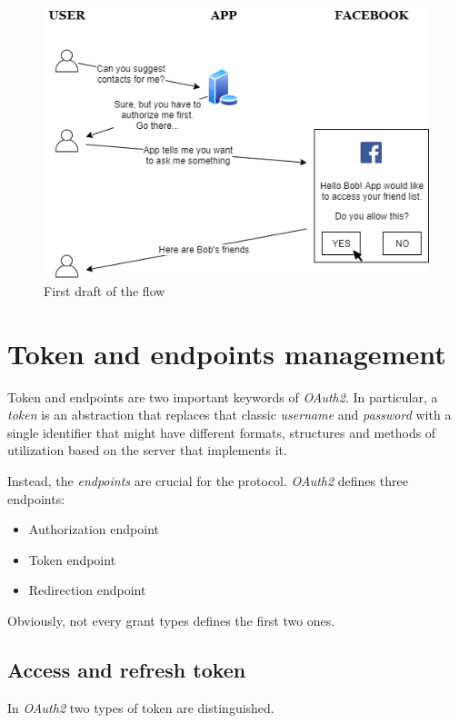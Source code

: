 \begin{figure}
    \centering
    \includegraphics[scale=0.74]{chapters/images/chp2/flow1.png}
    \caption{First draft of the flow}
    \label{fig:flow1}
    \vspace{0.5cm}
\end{figure}

\vspace{1cm}

\section{Token and endpoints management}
Token and endpoints are two important keywords of \textit{OAuth2}. In particular, a \textit{token} is an abstraction that replaces that classic \textit{username} and \textit{password} with a single identifier that might have different formats, structures and methods of utilization based on the server that implements it.

Instead, the \textit{endpoints} are crucial for the protocol. \textit{OAuth2} defines three endpoints:

\begin{itemize}
    \item Authorization endpoint
    \item Token endpoint
    \item Redirection endpoint
\end{itemize}

Obviously, not every grant types defines the first two ones.

\subsection{Access and refresh token}
\label{accref}
In \textit{OAuth2} two types of token are distinguished.

